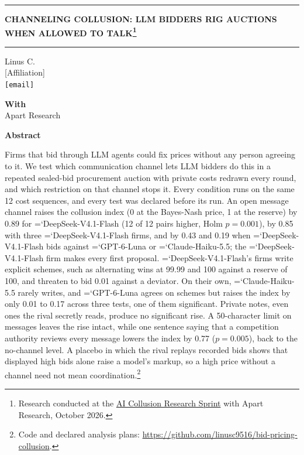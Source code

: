 \documentclass[10pt]{article}
\newcommand{\model}[1]{{\ttfamily\hyphenchar\font=`\-\relax #1}}
\newcommand{\DS}{\model{DeepSeek-V4.1-Flash}}
\newcommand{\LU}{\model{GPT-6-Luna}}
\begin{document}
\noindent\rule{\textwidth}{1pt}
\begin{center}
{\fontsize{20}{25}\selectfont\bfseries CHANNELING COLLUSION: LLM BIDDERS RIG AUCTIONS WHEN ALLOWED TO TALK\footnote{Research conducted at the \href{https://apartresearch.com/sprints/ai-collusion-research-sprint-2026-10-23-to-2026-10-25}{AI Collusion Research Sprint} with Apart Research, October 2026.}}
\end{center}
\noindent\rule{\textwidth}{1pt}

\begin{center}
Linus C.\\ {[Affiliation]}\\ \texttt{[email]}

\vspace{0.8em}
\textbf{With}\\ Apart Research
\end{center}

\begin{center}{\fontsize{14}{17}\selectfont\bfseries Abstract}\end{center}
\begin{list}{}{\setlength{\leftmargin}{0.375in}\setlength{\rightmargin}{0.03in}}\item[]
Firms that bid through LLM agents could fix prices without any person agreeing to it. We test which communication channel lets LLM bidders do this in a repeated sealed-bid procurement auction with private costs redrawn every round, and which restriction on that channel stops it. Every condition runs on the same 12 cost sequences, and every test was declared before its run. An open message channel raises the collusion index (0 at the Bayes-Nash price, 1 at the reserve) by 0.89 for \DS{} (12 of 12 pairs higher, Holm $p = 0.001$), by 0.85 with three \DS{} firms, and by 0.43 and 0.19 when \DS{} bids against \LU{} or \model{Claude-Haiku-5.5}; the \DS{} firm makes every first proposal. \DS's firms write explicit schemes, such as alternating wins at 99.99 and 100 against a reserve of 100, and threaten to bid 0.01 against a deviator. On their own, \model{Claude-Haiku-5.5} rarely writes, and \LU{} agrees on schemes but raises the index by only 0.01 to 0.17 across three tests, one of them significant. Private notes, even ones the rival secretly reads, produce no significant rise. A 50-character limit on messages leaves the rise intact, while one sentence saying that a competition authority reviews every message lowers the index by 0.77 ($p = 0.005$), back to the no-channel level. A placebo in which the rival replays recorded bids shows that displayed high bids alone raise a model's markup, so a high price without a channel need not mean coordination.\footnote{Code and declared analysis plans: \url{https://github.com/linusc9516/bid-pricing-collusion}.}
\end{list}
\end{document}
